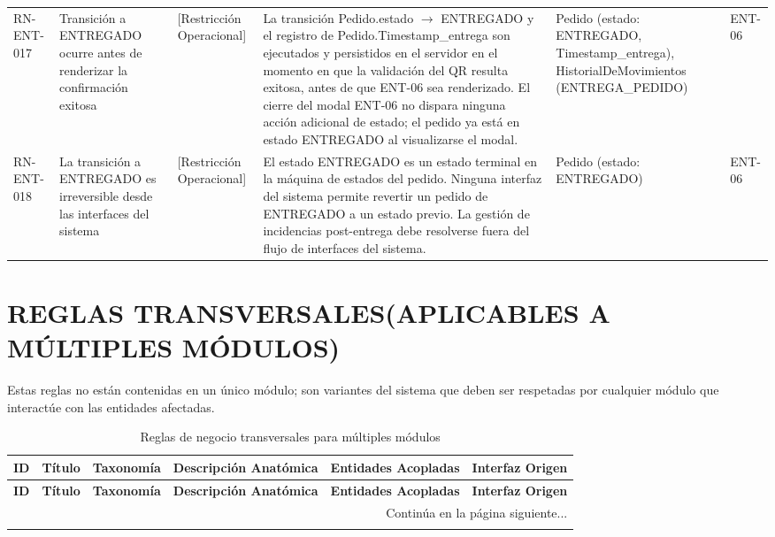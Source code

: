 \begin{landscape}
\begin{longtable}[c]{l p{2.1cm} p{2.1cm} p{8cm} p{4cm} p{3cm}}
RN-ENT-017 & Transición a ENTREGADO ocurre antes de renderizar la confirmación exitosa & [Restricción Operacional] & La transición Pedido.estado $\rightarrow$ ENTREGADO y el registro de Pedido.Timestamp\_entrega son ejecutados y persistidos en el servidor en el momento en que la validación del QR resulta exitosa, antes de que ENT-06 sea renderizado. El cierre del modal ENT-06 no dispara ninguna acción adicional de estado; el pedido ya está en estado ENTREGADO al visualizarse el modal. & Pedido (estado: ENTREGADO, Timestamp\_entrega), HistorialDeMovimientos (ENTREGA\_PEDIDO) & ENT-06 \\
\addlinespace
RN-ENT-018 & La transición a ENTREGADO es irreversible desde las interfaces del sistema & [Restricción Operacional] & El estado ENTREGADO es un estado terminal en la máquina de estados del pedido. Ninguna interfaz del sistema permite revertir un pedido de ENTREGADO a un estado previo. La gestión de incidencias post-entrega debe resolverse fuera del flujo de interfaces del sistema. & Pedido (estado: ENTREGADO) & ENT-06 \\
\end{longtable}
\endgroup

\section{REGLAS TRANSVERSALES(APLICABLES A MÚLTIPLES MÓDULOS)}
Estas reglas no están contenidas en un único módulo; son variantes del sistema que deben ser respetadas por cualquier módulo que interactúe con las entidades afectadas.
\begingroup
\setlength{\LTleft}{\fill}
\setlength{\LTright}{\fill}

\begin{longtable}[c]{l p{2.1cm} p{2.1cm} p{8cm} p{4cm} p{3cm}}
\caption{Reglas de negocio transversales para múltiples módulos} \label{tab:reglas-negocio-transversales-multiples-módulos}\\
\toprule
\textbf{ID} & \textbf{Título} & \textbf{Taxonomía} & \textbf{Descripción Anatómica} & \textbf{Entidades Acopladas} & \textbf{Interfaz Origen} \\
\midrule
\endfirsthead

\toprule
\textbf{ID} & \textbf{Título} & \textbf{Taxonomía} & \textbf{Descripción Anatómica} & \textbf{Entidades Acopladas} & \textbf{Interfaz Origen} \\
\midrule
\endhead

\midrule
\multicolumn{6}{r}{\small Continúa en la página siguiente...} \\
\endfoot
\bottomrule
\endlastfoot


\end{longtable}
\end{landscape}
